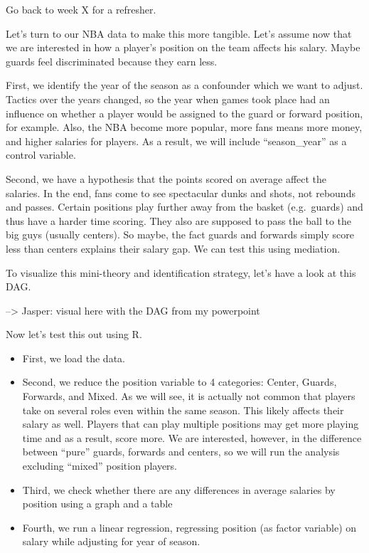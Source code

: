\documentclass[
]{book}
\providecommand{\tightlist}{%
  \setlength{\itemsep}{0pt}\setlength{\parskip}{0pt}}
\begin{document}
Go back to week X for a refresher.

Let's turn to our NBA data to make this more tangible. Let's assume now that we are interested in how a player's position on the team affects his salary. Maybe guards feel
discriminated because they earn less.

First, we identify the year of the season as a confounder which we want to adjust.
Tactics over the years changed, so the year when games took place had an influence on
whether a player would be assigned to the guard or forward position, for example.
Also, the NBA become more popular, more fans means more money, and higher salaries
for players. As a result, we will include ``season\_year'' as a control variable.

Second, we have a hypothesis that the points scored on average affect the salaries.
In the end, fans come to see spectacular dunks and shots, not rebounds and passes.
Certain positions play further away from the basket (e.g.~guards) and thus have a harder time scoring. They also are supposed to pass the ball to the big guys (usually centers).
So maybe, the fact guards and forwards simply score less than centers explains their salary gap. We can test this using mediation.

To visualize this mini-theory and identification strategy, let's have a look at this DAG.

--\textgreater{} Jasper: visual here with the DAG from my powerpoint

Now let's test this out using R.

\begin{itemize}
\tightlist
\item
  First, we load the data.
\item
  Second, we reduce the position variable to 4 categories: Center, Guards, Forwards, and Mixed. As we will see, it is actually not common that players take on several roles even within the same season. This likely affects their salary as well. Players that can play multiple positions may get more playing time and as a result, score more. We are interested, however, in the difference between ``pure'' guards, forwards and centers, so we will run the analysis excluding ``mixed'' position players.
\item
  Third, we check whether there are any differences in average salaries by position using a graph and a table
\item
  Fourth, we run a linear regression, regressing position (as factor variable) on salary while adjusting for year of season.
\end{itemize}
\end{document}
